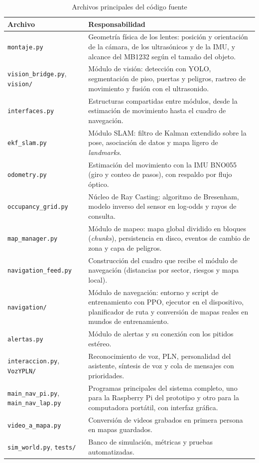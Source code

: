 \begin{table}[H]
\centering
\caption{Archivos principales del código fuente}
\label{tab:archivos_representacion}
\renewcommand{\arraystretch}{1.25}
\begin{tabular}{|p{4.2cm}|p{10.3cm}|}
\hline
\textbf{Archivo} & \textbf{Responsabilidad} \\
\hline
\texttt{montaje.py} & Geometría física de los lentes: posición y orientación de la
cámara, de los ultrasónicos y de la IMU, y alcance del MB1232 según el tamaño del
objeto. \\
\hline
\texttt{vision\_bridge.py}, \texttt{vision/} & Módulo de visión: detección con YOLO,
segmentación de piso, puertas y peligros, rastreo de movimiento y fusión con el
ultrasonido. \\
\hline
\texttt{interfaces.py} & Estructuras compartidas entre módulos, desde la estimación de
movimiento hasta el cuadro de navegación. \\
\hline
\texttt{ekf\_slam.py} & Módulo SLAM: filtro de Kalman extendido sobre la pose,
asociación de datos y mapa ligero de \emph{landmarks}. \\
\hline
\texttt{odometry.py} & Estimación del movimiento con la IMU BNO055 (giro y conteo de
pasos), con respaldo por flujo óptico. \\
\hline
\texttt{occupancy\_grid.py} & Núcleo de Ray Casting: algoritmo de Bresenham, modelo
inverso del sensor en log-odds y rayos de consulta. \\
\hline
\texttt{map\_manager.py} & Módulo de mapeo: mapa global dividido en bloques
(\emph{chunks}), persistencia en disco, eventos de cambio de zona y capa de
peligros. \\
\hline
\texttt{navigation\_feed.py} & Construcción del cuadro que recibe el módulo de
navegación (distancias por sector, riesgos y mapa local). \\
\hline
\texttt{navigation/} & Módulo de navegación: entorno y script de entrenamiento con PPO,
ejecutor en el dispositivo, planificador de ruta y conversión de mapas reales en
mundos de entrenamiento. \\
\hline
\texttt{alertas.py} & Módulo de alertas y su conexión con los pitidos estéreo. \\
\hline
\texttt{interaccion.py}, \texttt{VozYPLN/} & Reconocimiento de voz, PLN, personalidad
del asistente, síntesis de voz y cola de mensajes con prioridades. \\
\hline
\texttt{main\_nav\_pi.py}, \texttt{main\_nav\_lap.py} & Programas principales del
sistema completo, uno para la Raspberry Pi del prototipo y otro para la computadora
portátil, con interfaz gráfica. \\
\hline
\texttt{video\_a\_mapa.py} & Conversión de videos grabados en primera persona en mapas
guardados. \\
\hline
\texttt{sim\_world.py}, \texttt{tests/} & Banco de simulación, métricas y pruebas
automatizadas. \\
\hline
\end{tabular}
\end{table}

